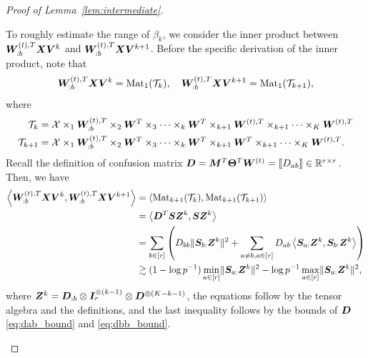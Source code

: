 \documentclass[lettersize,journal]{IEEEtran}
\theoremstyle{definition}
\theoremstyle{definition}
\newcommand{\of}[1]{\left(#1\right)}
\newcommand{\ang}[1]{\left\langle#1\right\rangle}
\begin{document}
\begin{proof}[Proof of Lemma~\ref{lem:intermediate}]
\begin{enumerate}
    To roughly estimate the range of $\beta_k$, we consider the inner product between $\bm{W}_{:b}^{(t),T} \bm X \bm{V}^k$ and $\bm{W}_{:b}^{(t),T} \bm X \bm{V}^{k+1}$. Before the specific derivation of the inner product, note that 
    \begin{equation}
        \bm{W}_{:b}^{(t),T} \bm X \bm{V}^k = \text{Mat}_1(\mathcal{T}_k), \quad  \bm{W}_{:b}^{(t),T} \bm X \bm{V}^{k+1} = \text{Mat}_1(\mathcal{T}_{k+1}),
    \end{equation}
    where 
    \begin{align}
        \mathcal{T}_k &= \mathcal{X} \times_1  \bm{W}_{:b}^{(t),T} \times_2 \bm{W}^T \times_3 \cdots \times_k \bm{W}^T \times_{k+1} \bm{W}^{(t),T} \times_{k+1} \cdots \times_K \bm{W}^{(t),T}\\
        \mathcal{T}_{k+1} &= \mathcal{X} \times_1  \bm{W}_{:b}^{(t),T} \times_2 \bm{W}^T \times_3 \cdots \times_k \bm{W}^T \times_{k+1} \bm{W}^{T} \times_{k+1} \cdots \times_K \bm{W}^{(t),T}. 
    \end{align}
    Recall the definition of confusion matrix $\bm{D} = \bm M^T \boldsymbol{\Theta}^T \bm{W}^{(t)} = \llbracket D_{ab} \rrbracket \in \mathbb{R}^{r \times r}$.
    Then, we have 
    \begin{align}
         \ang{\mW_{:b}^{(t),T} \mX \mV^k , \mW_{:b}^{(t),T} \mX \mV^{k+1}} 
         &  =\ang{ \mat_{k+1}(\tT_k), \mat_{k+1}(\tT_{k+1}) } \label{eq:j11_tensormat} \\
         & =  \ang{ \mD^T \mS \mZ^k ,  \mS \mZ^k   }\\
         & = \sum_{b \in [r]} \of{ D_{bb} \onormSize{}{\mS_{b:}\mZ^k}^2 + \sum_{a \neq b, a \in [r]} D_{ab} \ang{\mS_{a:} \mZ^k, \mS_{b:} \mZ^k}} \\
         & \gtrsim (1 - \log p^{-1}) \min_{a \in [r]}\onormSize{}{\mS_{a:}\mZ^k}^2 - \log p^{-1} \max_{a \in [r]} \onormSize{}{\mS_{a:}\mZ^k}^2, \label{eq:j11inner}
    \end{align}
    where $\bm Z^k = \bm{D}_{:b} \otimes \bm I_r^{\otimes (k-1)} \otimes  \bm{D}^{\otimes (K-k-1)}$, the equations follow by the tensor algebra and the definitions, and the last inequality follows by the bounds of $\bm{D}$ \eqref{eq:dab_bound} and \eqref{eq:dbb_bound}. 
    

\end{enumerate}
\end{proof}
\end{document}
